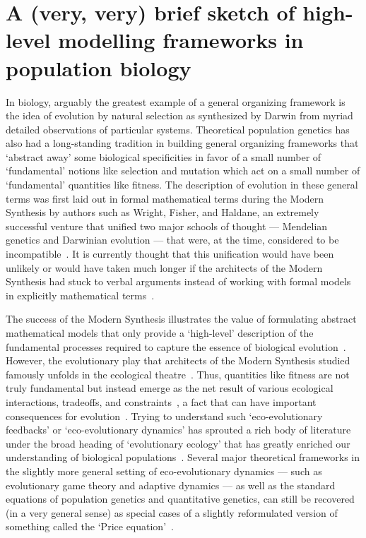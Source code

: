 \section{A (very, very) brief sketch of high-level modelling frameworks in population biology}\label{sec_history}

In biology, arguably the greatest example of a general organizing framework is the idea of evolution by natural selection as synthesized by Darwin from myriad detailed observations of particular systems. Theoretical population genetics has also had a long-standing tradition in building general organizing frameworks that `abstract away' some biological specificities in favor of a small number of `fundamental' notions like selection and mutation which act on a small number of `fundamental' quantities like fitness. The description of evolution in these general terms was first laid out in formal mathematical terms during the Modern Synthesis by authors such as Wright, Fisher, and Haldane, an extremely successful venture that unified two major schools of thought --- Mendelian genetics and Darwinian evolution --- that were, at the time, considered to be incompatible~\citep{provine_origins_2001}. It is currently thought that this unification would have been unlikely or would have taken much longer if the architects of the Modern Synthesis had stuck to verbal arguments instead of working with formal models in explicitly mathematical terms~\citep{walsh_darwins_2014}.

The success of the Modern Synthesis illustrates the value of formulating abstract mathematical models that only provide a `high-level' description of the fundamental processes required to capture the essence of biological evolution~\citep{provine_origins_2001,walsh_darwins_2014}. However, the evolutionary play that architects of the Modern Synthesis studied famously unfolds in the ecological theatre~\citep{hutchinson_ecological_1965}. Thus, quantities like fitness are not truly fundamental but instead emerge as the net result of various ecological interactions, tradeoffs, and constraints~\citep{metz_how_1992}, a fact that can have important consequences for evolution~\citep{coulson_putting_2006,schoener_newest_2011, kokko_can_2017}. Trying to understand such `eco-evolutionary feedbacks' or `eco-evolutionary dynamics' has sprouted a rich body of literature under the broad heading of `evolutionary ecology' that has greatly enriched our understanding of biological populations~\citep{coulson_putting_2006,metcalf_why_2007,schoener_newest_2011,brown_why_2016,kokko_can_2017,lion_theoretical_2018,govaert_eco-evolutionary_2019,svensson_eco-evolutionary_2019,hendry_critique_2019}. Several major theoretical frameworks in the slightly more general setting of eco-evolutionary dynamics --- such as evolutionary game theory and adaptive dynamics --- as well as the standard equations of population genetics and quantitative genetics, can still be recovered (in a very general sense) as special cases of a slightly reformulated version of something called the `Price equation'~\citep{page_unifying_2002,lion_theoretical_2018}.

